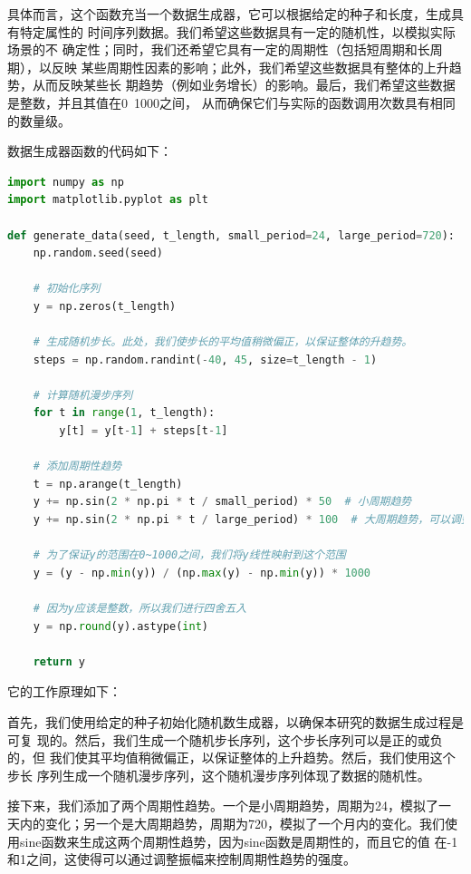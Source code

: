 \documentclass[a4paper,AutoFakeBold,oneside,12pt]{book}
\begin{document}
具体而言，这个函数充当一个数据生成器，它可以根据给定的种子和长度，生成具有特定属性的
时间序列数据。我们希望这些数据具有一定的随机性，以模拟实际场景的不
确定性；同时，我们还希望它具有一定的周期性（包括短周期和长周期），以反映
某些周期性因素的影响；此外，我们希望这些数据具有整体的上升趋势，从而反映某些长
期趋势（例如业务增长）的影响。最后，我们希望这些数据是整数，并且其值在0~1000之间，
从而确保它们与实际的函数调用次数具有相同的数量级。

数据生成器函数的代码如下：

\begin{lstlisting}[language=Python]
import numpy as np
import matplotlib.pyplot as plt

def generate_data(seed, t_length, small_period=24, large_period=720):
    np.random.seed(seed)
    
    # 初始化序列
    y = np.zeros(t_length)
    
    # 生成随机步长。此处，我们使步长的平均值稍微偏正，以保证整体的升趋势。
    steps = np.random.randint(-40, 45, size=t_length - 1)
    
    # 计算随机漫步序列
    for t in range(1, t_length):
        y[t] = y[t-1] + steps[t-1]
        
    # 添加周期性趋势
    t = np.arange(t_length)
    y += np.sin(2 * np.pi * t / small_period) * 50  # 小周期趋势
    y += np.sin(2 * np.pi * t / large_period) * 100  # 大周期趋势，可以调整振幅以增加或减少周期性趋势的强度
    
    # 为了保证y的范围在0~1000之间，我们将y线性映射到这个范围
    y = (y - np.min(y)) / (np.max(y) - np.min(y)) * 1000
    
    # 因为y应该是整数，所以我们进行四舍五入
    y = np.round(y).astype(int)
    
    return y
\end{lstlisting}

它的工作原理如下：

首先，我们使用给定的种子初始化随机数生成器，以确保本研究的数据生成过程是可复
现的。然后，我们生成一个随机步长序列，这个步长序列可以是正的或负的，但
我们使其平均值稍微偏正，以保证整体的上升趋势。然后，我们使用这个步长
序列生成一个随机漫步序列，这个随机漫步序列体现了数据的随机性。

接下来，我们添加了两个周期性趋势。一个是小周期趋势，周期为24，模拟了一
天内的变化；另一个是大周期趋势，周期为720，模拟了一个月内的变化。我们使
用sine函数来生成这两个周期性趋势，因为sine函数是周期性的，而且它的值
在-1和1之间，这使得可以通过调整振幅来控制周期性趋势的强度。
\end{document}
